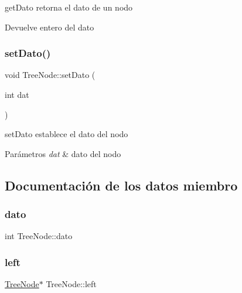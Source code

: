 get\+Dato retorna el dato de un nodo 

\begin{DoxyReturn}{Devuelve}
entero del dato 
\end{DoxyReturn}
\mbox{\label{class_tree_node_a0a29e2ef92e47a4617371d917f6642cc}} 
\subsubsection{\texorpdfstring{set\+Dato()}{setDato()}}
{\footnotesize\ttfamily void Tree\+Node\+::set\+Dato (\begin{DoxyParamCaption}\item[{int}]{dat }\end{DoxyParamCaption})\hspace{0.3cm}{\ttfamily [inline]}}



set\+Dato establece el dato del nodo 


\begin{DoxyParams}{Parámetros}
{\em dat} & dato del nodo \\
\hline
\end{DoxyParams}


\subsection{Documentación de los datos miembro}
\mbox{\label{class_tree_node_a40d32c7fb4e335b91b8b63078fbf3b68}} 
\subsubsection{\texorpdfstring{dato}{dato}}
{\footnotesize\ttfamily int Tree\+Node\+::dato}

\mbox{\label{class_tree_node_a5335e7d975822e87088ec2afdefb1736}} 
\subsubsection{\texorpdfstring{left}{left}}
{\footnotesize\ttfamily \mbox{\hyperlink{class_tree_node}{Tree\+Node}}$\ast$ Tree\+Node\+::left}

